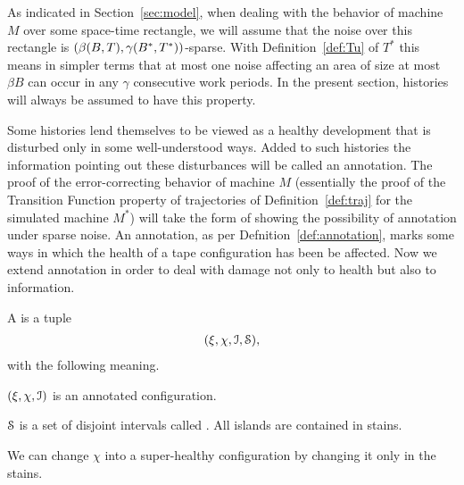 \documentclass[11pt]{memoir}
\theoremstyle{definition} %
\def\B{B}
\newcommand{\Tu}{T}
\newcommand{\Tus}{T^{*}}
\begin{document}
As indicated in Section~\ref{sec:model}, when dealing with the behavior
of machine \( M \) over some space-time rectangle, we will assume that the noise
over this rectangle is \( (\beta\pair{\B}{\Tu}, \gamma\pair{\B^{*}}{\Tus}) \)-sparse.
With Definition~\ref{def:Tu} of \( \Tus \) this means 
in simpler terms that at most one noise  affecting an
area of size at most \( \beta\B \) can occur in any \( \gamma \) consecutive work periods.
In the present section, histories will always be assumed to have this property.

Some histories lend themselves to be viewed as a healthy development
that is disturbed only in some well-understood ways.
Added to such histories the information pointing out these disturbances will be called an annotation.
The proof of the error-correcting behavior of machine \( M \) (essentially the proof of the Transition Function
property of trajectories of Definition~\ref{def:traj} for the simulated machine \( M^{*} \))
will take the form of showing the possibility of annotation under sparse noise.
An annotation, as per Defnition~\ref{def:annotation}, marks some ways in which the health 
of a tape configuration has been be affected.
Now we extend annotation in order to deal with damage not only to health but also to information.

\begin{definition}\label{def:super-annotation}
  A  is a tuple
  \begin{align*}
    (\xi,\chi, \mathcal{I}, \mathcal{S}),
  \end{align*}
  with the following meaning.

\( (\xi,\chi,\mathcal{I}) \) is an annotated configuration.

\( \mathcal{S} \) is a set of disjoint intervals called .
All islands are contained in stains.

We can change \( \chi \) into a super-healthy configuration by changing it only in the stains.
  \end{definition}
\end{document}
